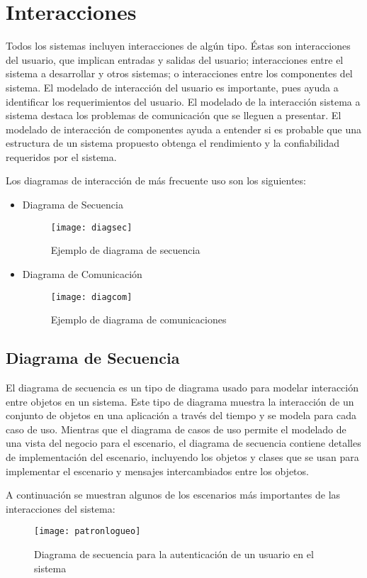\newpage

\section{Interacciones}
Todos los sistemas incluyen interacciones de algún tipo. Éstas son interacciones del usuario, que implican entradas y salidas del usuario; interacciones entre el sistema a desarrollar y otros sistemas; o interacciones entre los componentes del sistema. El modelado de interacción del usuario es importante, pues ayuda a identificar los requerimientos del usuario. El modelado de la interacción sistema a sistema destaca los problemas de comunicación que se lleguen a presentar. El modelado de interacción de componentes ayuda a entender si es probable que una estructura de un sistema propuesto obtenga el rendimiento y la confiabilidad requeridos por el sistema.\cite{modeladosistema}

Los diagramas de interacción de más frecuente uso son los siguientes:
\begin{itemize}
\item Diagrama de Secuencia
\begin{figure}[H]
	\centering
	\texttt{[image: diagsec]}
    \caption{Ejemplo de diagrama de secuencia}
	\label{fig:dseEjemplo}
\end{figure}
\item Diagrama de Comunicación
\begin{figure}[H]
	\centering
	\texttt{[image: diagcom]}
    \caption{Ejemplo de diagrama de comunicaciones}
	\label{fig:dcomEjemplo}
\end{figure}
\end{itemize}
\newpage
\subsection{Diagrama de Secuencia}
El diagrama de secuencia es un tipo de diagrama usado para modelar interacción entre objetos
en un sistema. Este tipo de diagrama muestra la interacción de un conjunto de objetos en una aplicación
a través del tiempo y se modela para cada caso de uso. Mientras que el diagrama de casos de uso
permite el modelado de una vista del negocio para el escenario, el diagrama de secuencia contiene detalles
de implementación del escenario, incluyendo los objetos y clases que se usan para implementar el
escenario y mensajes intercambiados entre los objetos.

A continuación se muestran algunos de los escenarios más importantes de las interacciones del sistema:
\begin{figure}[th!]
	\centering
	\texttt{[image: patronlogueo]}
    \centering
    \caption{Diagrama de secuencia para la autenticación de un usuario en el sistema}
	\label{fig:patronlogueo}
\end{figure}

